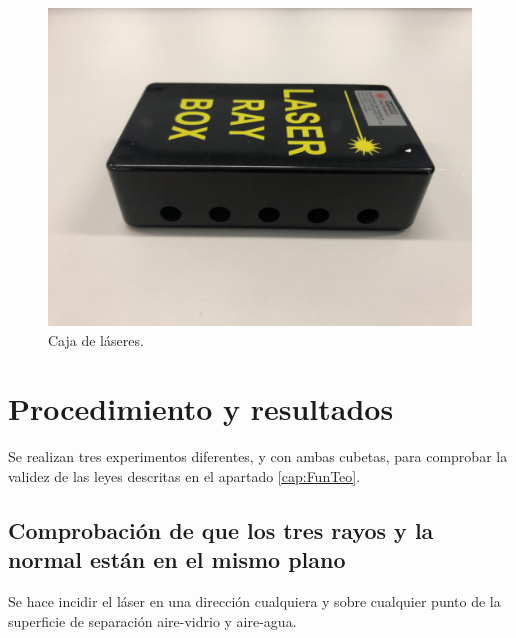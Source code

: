 \documentclass[a4paper,twocolumn]{article}
\begin{document}
\begin{itemize}
            \begin{figure}[h!]
                \centering
                \includegraphics[width = 0.9\linewidth]{Fotos/Laser box.jpg}
                \caption{Caja de láseres.}
                \label{fig:CajLas}
            \end{figure}

        \end{itemize}




 
	\section{Procedimiento y resultados}

    
    
    
    Se realizan tres experimentos diferentes, y con ambas cubetas, para comprobar la validez de las leyes descritas en el apartado \ref{cap:FunTeo}.
    
        \subsection{Comprobación de que los tres rayos y la normal están en el mismo plano}
        
            Se hace incidir el láser en una dirección cualquiera y sobre cualquier punto de la superficie de separación aire-vidrio y aire-agua.
            
\end{document}
